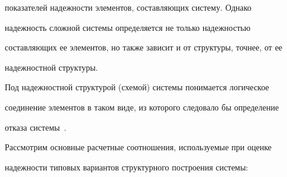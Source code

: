 показателей надежности элементов, составляющих систему. Однако 


надежность сложной системы определяется не только надежностью 


составляющих ее элементов, но также зависит и от структуры, точнее, от ее 


надежностной структуры.


     


     Под надежностной структурой (схемой) системы понимается логическое 


соединение элементов в таком виде, из которого следовало бы определение 


отказа системы~\cite{7-2-3, 5-2-3}.


     





     


     Рассмотрим основные расчетные соотношения, используемые при оценке 


надежности типовых вариантов структурного построения системы:


